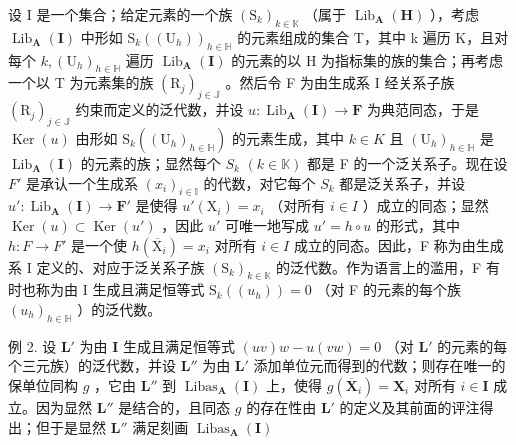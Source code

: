 设 I 是一个集合；给定元素的一个族 \((\mathrm{S}_{k})_{k\in\mathbb{K}}\) （属于 \(\operatorname{Lib}_{\mathbf{A}}(\mathbf{H})\) ），考虑 \(\operatorname{Lib}_{\mathbf{A}}(\mathbf{I})\) 中形如 \(\mathrm{S}_{k}((\mathrm{U}_{h}))_{h\in\mathbb{H}}\) 的元素组成的集合 T，其中 k 遍历 K，且对每个 \(k,\left(\mathrm{U}_{h}\right)_{h\in\mathbb{H}}\) 遍历 \(\operatorname{Lib}_{\mathbf{A}}(\mathbf{I})\) 的元素的以 H 为指标集的族的集合；再考虑一个以 T 为元素集的族 \((\mathrm{R}_{j})_{j\in\mathbb{J}}\) 。然后令 F 为由生成系 I 经关系子族 \((\mathrm{R}_{j})_{j\in\mathbb{J}}\) 约束而定义的泛代数，并设 \(u:\operatorname{Lib}_{\mathbf{A}}(\mathbf{I})\to\mathbf{F}\) 为典范同态，于是 \(\operatorname{Ker}(u)\) 由形如 \(\mathrm{S}_{k}((\mathrm{U}_{h})_{h\in\mathbb{H}})\) 的元素生成，其中 \(k\in K\) 且 \((\mathrm{U}_{h})_{h\in\mathbb{H}}\) 是 \(\operatorname{Lib}_{\mathbf{A}}(\mathbf{I})\) 的元素的族；显然每个 \(S_{k}\) \((k\in\mathbb{K})\) 都是 F 的一个泛关系子。现在设 \(F'\) 是承认一个生成系 \((x_{i})_{i\in\mathbb{I}}\) 的代数，对它每个 \(S_{k}\) 都是泛关系子，并设 \(u':\operatorname{Lib}_{\mathbf{A}}(\mathbf{I})\to\mathbf{F}'\) 是使得 \(u'(\mathrm{X}_{i})=x_{i}\) （对所有 \(i\in I\) ）成立的同态；显然 \(\operatorname{Ker}(u)\subset\operatorname{Ker}(u')\) ，因此 \(u'\) 可唯一地写成 \(u'=h\circ u\) 的形式，其中 \(h:F\to F'\) 是一个使 \(h(\overline{\mathrm{X}}_{i})=x_{i}\) 对所有 \(i\in I\) 成立的同态。因此，F 称为由生成系 I 定义的、对应于泛关系子族 \((\mathrm{S}_{k})_{k\in\mathbb{K}}\) 的泛代数。作为语言上的滥用，F 有时也称为由 I 生成且满足恒等式 \(\mathrm{S}_{k}((u_{h}))=0\) （对 F 的元素的每个族 \((u_{h})_{h\in\mathbb{H}}\) ）的泛代数。

例 2. 设 \(\mathbf{L}'\) 为由 \(\mathbf{I}\) 生成且满足恒等式 \((uv)w - u(vw) = 0\) （对 \(\mathbf{L}'\) 的元素的每个三元族）的泛代数，并设 \(\mathbf{L}''\) 为由 \(\mathbf{L}'\) 添加单位元而得到的代数；则存在唯一的保单位同构 \(g\) ，它由 \(\mathbf{L}''\) 到 \(\operatorname{Libas}_{\mathbf{A}}(\mathbf{I})\) 上，使得 \(g(\overline{\mathbf{X}}_i) = \mathbf{X}_i\) 对所有 \(i \in \mathbf{I}\) 成立。因为显然 \(\mathbf{L}''\) 是结合的，且同态 \(g\) 的存在性由 \(\mathbf{L}'\) 的定义及其前面的评注得出；但于是显然 \(\mathbf{L}''\) 满足刻画 \(\operatorname{Libas}_{\mathbf{A}}(\mathbf{I})\)


